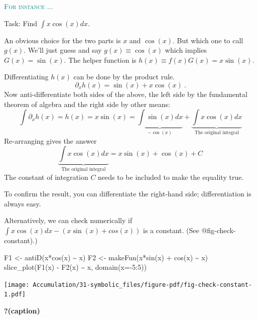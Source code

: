 \documentclass[
  letterpaper,
  DIV=11,
  numbers=noendperiod,
  oneside]{scrreprt}
\newenvironment{Shaded}{\begin{snugshade}}{\end{snugshade}}
\newcommand{\AttributeTok}[1]{\textcolor[rgb]{0.40,0.46,0.14}{#1}}
\newcommand{\DecValTok}[1]{\textcolor[rgb]{0.68,0.00,0.00}{#1}}
\newcommand{\FunctionTok}[1]{\textcolor[rgb]{0.28,0.35,0.67}{#1}}
\newcommand{\NormalTok}[1]{\textcolor[rgb]{0.00,0.46,0.62}{#1}}
\newcommand{\OtherTok}[1]{\textcolor[rgb]{0.00,0.46,0.62}{#1}}
\newcommand{\SpecialCharTok}[1]{\textcolor[rgb]{0.37,0.37,0.37}{#1}}
\newenvironment{example}%
{%
\textcolor{teal}{\hrulefill}%
  \par\vspace{.3\baselineskip}%
  \textcolor{teal}{\scshape For instance ...}%
  \par\vspace{\baselineskip}%
}%
{\textcolor{teal}{\hrulefill}}
\begin{document}
\begin{example}

Task: Find \(\int x \cos(x) dx\).

An obvious choice for the two parts is \(x\) and \(\cos(x)\). But which
one to call \(g(x)\). We'll just guess and say \(g(x)\equiv \cos(x)\)
which implies \(G(x) = \sin(x)\). The helper function is
\(h(x) \equiv f(x) G(x) = x \sin(x)\).

Differentiating \(h(x)\) can be done by the product rule.
\[\partial_x h(x) = \sin(x) + x \cos(x)\ .\] Now anti-differentiate both
sides of the above, the left side by the fundamental theorem of algebra
and the right side by other means:
\[\int \partial_x h(x) = h(x) = x \sin(x)= \underbrace{\int\sin(x)dx}_{-\cos(x)} + \underbrace{\int x \cos(x) dx}_\text{The original integral}\]
Re-arranging gives the answer
\[\underbrace{\int x \cos(x) dx}_\text{The original integral} = x \sin(x) + \cos(x) + C\]
The constant of integration \(C\) needs to be included to make the
equality true.

To confirm the result, you can differentiate the right-hand side;
differentiation is always easy.

Alternatively, we can check numerically if
\(\int x \cos(x) dx - (x\sin(x)+cos(x))\) is a constant. (See
@fig-check-constant).)

\begin{Shaded}
\begin{Highlighting}[]
\NormalTok{F1 }\OtherTok{\textless{}{-}} \FunctionTok{antiD}\NormalTok{(x}\SpecialCharTok{*}\FunctionTok{cos}\NormalTok{(x) }\SpecialCharTok{\textasciitilde{}}\NormalTok{ x)}
\NormalTok{F2 }\OtherTok{\textless{}{-}} \FunctionTok{makeFun}\NormalTok{(x}\SpecialCharTok{*}\FunctionTok{sin}\NormalTok{(x) }\SpecialCharTok{+} \FunctionTok{cos}\NormalTok{(x) }\SpecialCharTok{\textasciitilde{}}\NormalTok{ x)}
\FunctionTok{slice\_plot}\NormalTok{(}\FunctionTok{F1}\NormalTok{(x) }\SpecialCharTok{{-}} \FunctionTok{F2}\NormalTok{(x) }\SpecialCharTok{\textasciitilde{}}\NormalTok{ x, }\FunctionTok{domain}\NormalTok{(}\AttributeTok{x=}\SpecialCharTok{{-}}\DecValTok{5}\SpecialCharTok{:}\DecValTok{5}\NormalTok{))}
\end{Highlighting}
\end{Shaded}

\begin{marginfigure}

{\centering \texttt{[image: Accumulation/31-symbolic\_files/figure-pdf/fig-check-constant-1.pdf]}

}

\caption{\label{fig-check-constant}\textbf{?(caption)}}

\end{marginfigure}

\end{example}
\end{document}
